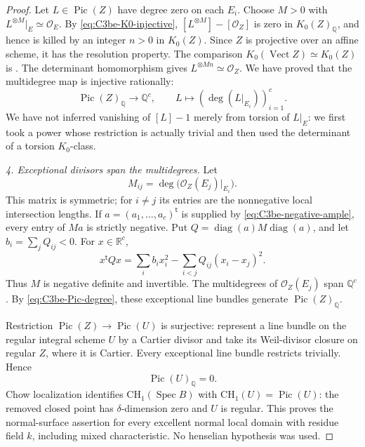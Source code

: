 \begin{proof}
Let \(L\in\operatorname{Pic}(Z)\) have degree zero on each
\(E_i\). Choose \(M>0\) with
\(L^{\otimes M}|_E\simeq\mathcal O_E\).
By \eqref{eq:C3be-K0-injective},
\([L^{\otimes M}]-[\mathcal O_Z]\) is zero in
\(K_0(Z)_{\mathbb Q}\), and hence is killed by an integer
\(n>0\) in \(K_0(Z)\). Since \(Z\) is projective over an
affine scheme, it has the resolution property. The comparison
\(K_0(\operatorname{Vect}Z)\simeq K_0(Z)\) is
\citet[Lemma 36.38.5, Tag 0FDJ]{frC3beStacksVectorK0}.
The determinant homomorphism
\citep[Section 17.26 and Lemma 17.26.1, Tag 0B37]
{frC3beStacksDeterminant} gives
\(L^{\otimes Mn}\simeq\mathcal O_Z\). We have proved that
the multidegree map is injective rationally:
\begin{equation}\label{eq:C3be-Pic-degree}
 \operatorname{Pic}(Z)_{\mathbb Q}\longrightarrow\mathbb Q^c,
 \qquad L\longmapsto(\deg(L|_{E_i}))_{i=1}^{c}.
\end{equation}
We have not inferred vanishing of \([L]-1\) merely from
torsion of \(L|_E\): we first took a power whose restriction
is actually trivial and then used the determinant of a
torsion \(K_0\)-class.

\emph{4. Exceptional divisors span the multidegrees.}
Let
\[
              M_{ij}=\deg\bigl(\mathcal O_Z(E_j)|_{E_i}\bigr).
\]
This matrix is symmetric; for \(i\ne j\) its entries are the
nonnegative local intersection lengths. If
\(a=(a_1,\ldots,a_c)^{\mathsf t}\) is supplied by
\eqref{eq:C3be-negative-ample}, every entry of \(Ma\) is
strictly negative. Put
\(Q=\operatorname{diag}(a)M\operatorname{diag}(a)\), and let
\(b_i=\sum_jQ_{ij}<0\). For \(x\in\mathbb R^c\),
\[
 x^{\mathsf t}Qx
       =\sum_i b_i x_i^2
          -\sum_{i<j}Q_{ij}(x_i-x_j)^2.
\]
Thus \(M\) is negative definite and invertible. The multidegrees
of \(\mathcal O_Z(E_j)\) span \(\mathbb Q^c\).
By \eqref{eq:C3be-Pic-degree}, these exceptional line bundles
generate \(\operatorname{Pic}(Z)_{\mathbb Q}\).

Restriction \(\operatorname{Pic}(Z)\to\operatorname{Pic}(U)\)
is surjective: represent a line bundle on the regular integral
scheme \(U\) by a Cartier divisor and take its Weil-divisor
closure on regular \(Z\), where it is Cartier.
Every exceptional line bundle restricts trivially. Hence
\begin{equation}\label{eq:C3be-surface-Pic-zero}
                     \operatorname{Pic}(U)_{\mathbb Q}=0.
\end{equation}
Chow localization identifies
\(\mathrm{CH}_1(\operatorname{Spec}B)\) with
\(\mathrm{CH}_1(U)=\operatorname{Pic}(U)\): the removed
closed point has \(\delta\)-dimension zero and \(U\) is regular.
This proves the normal-surface assertion for every excellent
normal local domain with residue field \(k\), including mixed
characteristic. No henselian hypothesis was used.


\end{proof}

